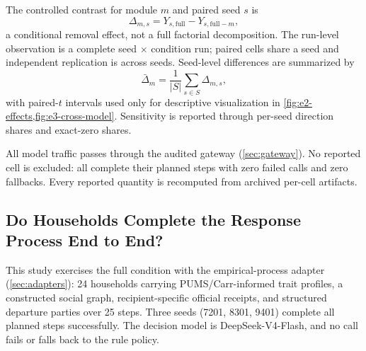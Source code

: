 \documentclass[journal]{IEEEtran}
\begin{document}
The controlled contrast for module $m$ and paired seed $s$ is
\begin{equation}
  \Delta_{m,s}=Y_{s,\mathrm{full}}-Y_{s,\mathrm{full}-m},
  \label{eq:ablation}
\end{equation}
a conditional removal effect, not a full factorial decomposition. The run-level
observation is a complete seed$\,\times\,$condition run; paired cells share a
seed and independent replication is across seeds. Seed-level differences are
summarized by
\begin{equation}
  \bar{\Delta}_m=\frac{1}{|S|}\sum_{s\in S}\Delta_{m,s},
  \label{eq:paired-summary}
\end{equation}
with paired-$t$ intervals used only for descriptive visualization in
\cref{fig:e2-effects,fig:e3-cross-model}. Sensitivity is reported through
per-seed direction shares and exact-zero shares.

All model traffic passes through the audited gateway (\cref{sec:gateway}). No
reported cell is excluded: all complete their planned steps with zero failed
calls and zero fallbacks. Every reported quantity is recomputed from archived
per-cell artifacts.

\subsection{Do Households Complete the Response Process End to End?}
\label{sec:exp-e1}

This study exercises the full condition with the empirical-process adapter
(\cref{sec:adapters}): 24 households carrying PUMS/Carr-informed trait
profiles, a constructed social graph, recipient-specific official receipts, and
structured departure parties over 25 steps. Three seeds (7201, 8301, 9401)
complete all planned steps successfully. The decision model is
DeepSeek-V4-Flash, and no call fails or falls back to the rule policy.
\end{document}
